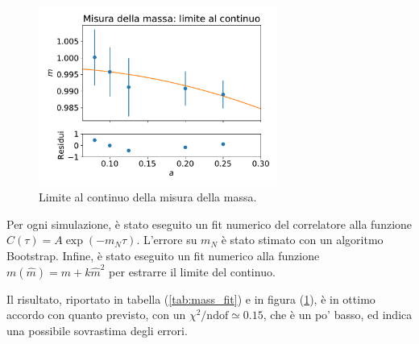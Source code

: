 \documentclass[a4paper,11pt]{article}
\newcommand{\chindof}{\chi^2 / \text{ndof}}
\begin{document}
   
    \begin{figure}[htb]
        \centering
        \includegraphics[width=0.7\textwidth]{figures/mass_continuum.pdf}
        \caption{Limite al continuo della misura della massa.}
        \label{fig:mass_fit}
    \end{figure}
    
    Per ogni simulazione, è stato eseguito un fit numerico del correlatore alla funzione $C(\tau) = A \exp (-m_N\tau)$. L'errore su $m_N$ è stato stimato con un algoritmo Bootstrap. Infine, è stato eseguito un fit numerico alla funzione $m(\hat{m}) = m + k \hat{m}^2$ per estrarre il limite del continuo.
    
    Il risultato, riportato in tabella (\ref{tab:mass_fit}) e in figura (\ref{fig:mass_fit}), è in ottimo accordo con quanto previsto, con un $\chindof \simeq 0.15$, che è un po' basso, ed indica una possibile sovrastima degli errori.
    

    

    
\end{document}

